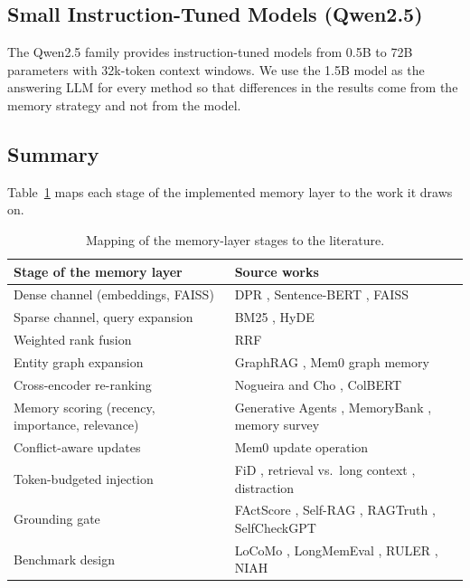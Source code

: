 \subsection{Small Instruction-Tuned Models (Qwen2.5)}
The Qwen2.5 family \cite{qwen25} provides instruction-tuned models from 0.5B to 72B parameters with 32k-token
context windows. We use the 1.5B model as the answering LLM for every method so that differences in the
results come from the memory strategy and not from the model.

\subsection{Summary}
Table~\ref{tab:litmap} maps each stage of the implemented memory layer to the work it draws on.
\begin{table}[htbp]\centering\small
\begin{tabular}{p{4.2cm}p{9.3cm}}\hline
\textbf{Stage of the memory layer} & \textbf{Source works} \\\hline
Dense channel (embeddings, FAISS) & DPR \cite{dpr}, Sentence-BERT \cite{sbert}, FAISS \cite{faiss} \\
Sparse channel, query expansion & BM25 \cite{bm25}, HyDE \cite{hyde} \\
Weighted rank fusion & RRF \cite{rrf} \\
Entity graph expansion & GraphRAG \cite{graphrag}, Mem0 graph memory \cite{mem0} \\
Cross-encoder re-ranking & Nogueira and Cho \cite{nogueira2019}, ColBERT \cite{colbert} \\
Memory scoring (recency, importance, relevance) & Generative Agents \cite{park2023}, MemoryBank \cite{zhong2024}, memory survey \cite{memsurvey} \\
Conflict-aware updates & Mem0 update operation \cite{mem0} \\
Token-budgeted injection & FiD \cite{fid}, retrieval vs.\ long context \cite{retrievalmeetslong}, distraction \cite{distracted} \\
Grounding gate & FActScore \cite{factscore}, Self-RAG \cite{selfrag}, RAGTruth \cite{ragtruth}, SelfCheckGPT \cite{selfcheck} \\
Benchmark design & LoCoMo \cite{locomo}, LongMemEval \cite{longmemeval}, RULER \cite{ruler}, NIAH \cite{niah2025} \\\hline
\end{tabular}
\caption{Mapping of the memory-layer stages to the literature.}\label{tab:litmap}
\end{table}


